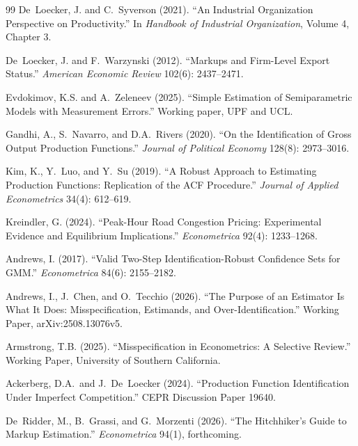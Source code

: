 \documentclass[11pt]{article}
\begin{document}
\begin{thebibliography}{99}
De~Loecker, J. and C.~Syverson (2021).
``An Industrial Organization Perspective on Productivity.''
In \emph{Handbook of Industrial Organization}, Volume 4, Chapter 3.

De~Loecker, J. and F.~Warzynski (2012).
``Markups and Firm-Level Export Status.''
\emph{American Economic Review} 102(6): 2437--2471.

Evdokimov, K.S. and A.~Zeleneev (2025).
``Simple Estimation of Semiparametric Models with Measurement Errors.''
Working paper, UPF and UCL.

Gandhi, A., S.~Navarro, and D.A.~Rivers (2020).
``On the Identification of Gross Output Production Functions.''
\emph{Journal of Political Economy} 128(8): 2973--3016.

Kim, K., Y.~Luo, and Y.~Su (2019).
``A Robust Approach to Estimating Production Functions: Replication of the ACF Procedure.''
\emph{Journal of Applied Econometrics} 34(4): 612--619.

Kreindler, G. (2024).
``Peak-Hour Road Congestion Pricing: Experimental Evidence and Equilibrium Implications.''
\emph{Econometrica} 92(4): 1233--1268.

Andrews, I. (2017).
``Valid Two-Step Identification-Robust Confidence Sets for GMM.''
\emph{Econometrica} 84(6): 2155--2182.

Andrews, I., J.~Chen, and O.~Tecchio (2026).
``The Purpose of an Estimator Is What It Does: Misspecification, Estimands, and Over-Identification.''
Working Paper, arXiv:2508.13076v5.

Armstrong, T.B. (2025).
``Misspecification in Econometrics: A Selective Review.''
Working Paper, University of Southern California.

Ackerberg, D.A.\ and J.\ De~Loecker (2024).
``Production Function Identification Under Imperfect Competition.''
CEPR Discussion Paper 19640.

De~Ridder, M., B.~Grassi, and G.~Morzenti (2026).
``The Hitchhiker's Guide to Markup Estimation.''
\emph{Econometrica} 94(1), forthcoming.


\end{thebibliography}
\end{document}
